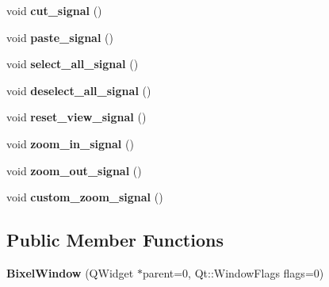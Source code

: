 \begin{DoxyCompactItemize}
\item 
\hypertarget{classBixelWindow_a1fe8ae25f04273997c5b23bbb161af4e}{void {\bfseries cut\-\_\-signal} ()}\label{classBixelWindow_a1fe8ae25f04273997c5b23bbb161af4e}

\item 
\hypertarget{classBixelWindow_a587d0745d036eabace33de931104d4c7}{void {\bfseries paste\-\_\-signal} ()}\label{classBixelWindow_a587d0745d036eabace33de931104d4c7}

\item 
\hypertarget{classBixelWindow_a42b6e8b3cc3f837a6233c616ea26a9c4}{void {\bfseries select\-\_\-all\-\_\-signal} ()}\label{classBixelWindow_a42b6e8b3cc3f837a6233c616ea26a9c4}

\item 
\hypertarget{classBixelWindow_a5e64c14663eadc91c7c6015d4981fb70}{void {\bfseries deselect\-\_\-all\-\_\-signal} ()}\label{classBixelWindow_a5e64c14663eadc91c7c6015d4981fb70}

\item 
\hypertarget{classBixelWindow_a119d72d0e838a8d3689a3adecd4525e4}{void {\bfseries reset\-\_\-view\-\_\-signal} ()}\label{classBixelWindow_a119d72d0e838a8d3689a3adecd4525e4}

\item 
\hypertarget{classBixelWindow_a3905766a93b07f84fb2a42bf06d83f06}{void {\bfseries zoom\-\_\-in\-\_\-signal} ()}\label{classBixelWindow_a3905766a93b07f84fb2a42bf06d83f06}

\item 
\hypertarget{classBixelWindow_afe6f72f82acd783d9a558b7c0e320dd3}{void {\bfseries zoom\-\_\-out\-\_\-signal} ()}\label{classBixelWindow_afe6f72f82acd783d9a558b7c0e320dd3}

\item 
\hypertarget{classBixelWindow_a8b65e3840cb126f9d38d4edf7df0eba9}{void {\bfseries custom\-\_\-zoom\-\_\-signal} ()}\label{classBixelWindow_a8b65e3840cb126f9d38d4edf7df0eba9}

\end{DoxyCompactItemize}
\subsection*{Public Member Functions}
\begin{DoxyCompactItemize}
\item 
\hypertarget{classBixelWindow_ae334b79d3ae7e7dbd9a967c5a4281fdc}{{\bfseries Bixel\-Window} (Q\-Widget $\ast$parent=0, Qt\-::\-Window\-Flags flags=0)}\label{classBixelWindow_ae334b79d3ae7e7dbd9a967c5a4281fdc}

\end{DoxyCompactItemize}
